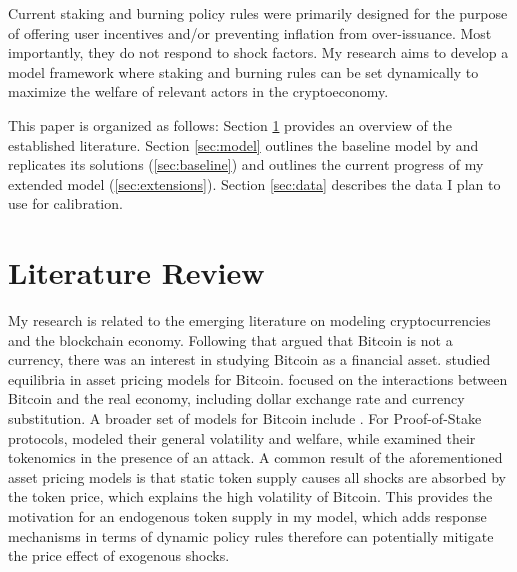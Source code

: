 \documentclass[12pt]{article}
\begin{document}
Current staking and burning policy rules were primarily designed for the purpose of offering user incentives and/or preventing inflation from over-issuance. Most importantly, they do not respond to shock factors. My research aims to develop a model framework where staking and burning rules can be set dynamically to maximize the welfare of relevant actors in the cryptoeconomy.

This paper is organized as follows: Section \ref{sec:literature} provides an overview of the established literature. Section \ref{sec:model} outlines the baseline model by \citet{biais2023equilibrium} and replicates its solutions (\ref{sec:baseline}) and outlines the current progress of my extended model (\ref{sec:extensions}). Section \ref{sec:data} describes the data I plan to use for calibration.


\section{Literature Review}
\label{sec:literature}
My research is related to the emerging literature on modeling cryptocurrencies and the blockchain economy. Following \citet{yermack2015bitcoin} that argued that Bitcoin is not a currency, there was an interest in studying Bitcoin as a financial asset. \citet{athey2016bitcoin, garratt2018bitcoin, biais2023equilibrium, pagnotta2022decentralizing} studied equilibria in asset pricing models for Bitcoin. \citet{schilling2019some, schilling2019currency} focused on the interactions between Bitcoin and the real economy, including dollar exchange rate and currency substitution. A broader set of models for Bitcoin include \citet{bolt2020value, catalini2020some, hinzen2022bitcoin, chiu2017economics, huberman2021monopoly}. For Proof-of-Stake protocols, \citet{saleh2019volatility, saleh2021blockchain} modeled their general volatility and welfare, while \citet{catalini2020markets} examined their tokenomics in the presence of an attack. A common result of the aforementioned asset pricing models is that static token supply causes all shocks are absorbed by the token price, which explains the high volatility of Bitcoin. This provides the motivation for an endogenous token supply in my model, which adds response mechanisms in terms of dynamic policy rules therefore can potentially mitigate the price effect of exogenous shocks.
\end{document}
